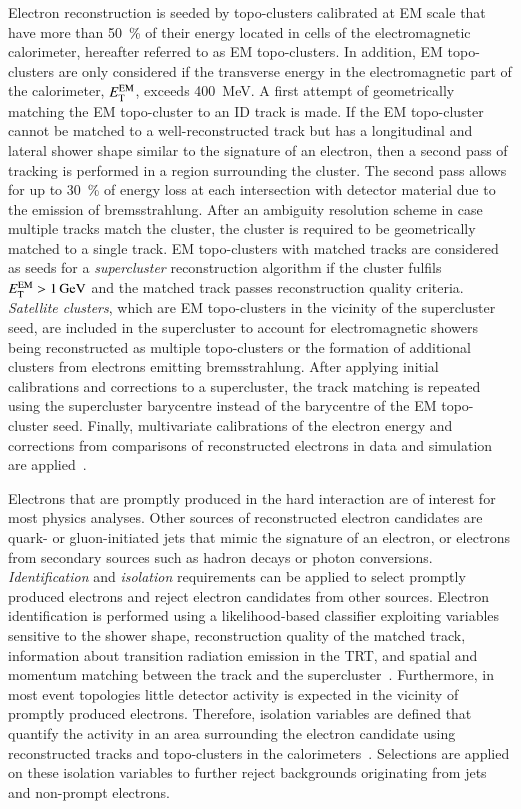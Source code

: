 Electron reconstruction is seeded by topo-clusters calibrated at EM scale that
have more than \SI{50}{\percent} of their energy located in cells of the
electromagnetic calorimeter, hereafter referred to as EM topo-clusters. In
addition, EM topo-clusters are only considered if the transverse energy in the
electromagnetic part of the calorimeter, $E_{\text{T}}^{\text{EM}}$, exceeds
\SI{400}{\MeV}. A first attempt of geometrically matching the EM topo-cluster to
an ID track is made. If the EM topo-cluster cannot be matched to a
well-reconstructed track but has a longitudinal and lateral shower shape similar
to the signature of an electron, then a second pass of tracking is performed in
a region surrounding the cluster. The second pass allows for up to
\SI{30}{\percent} of energy loss at each intersection with detector material due
to the emission of bremsstrahlung. After an ambiguity resolution scheme in case
multiple tracks match the cluster, the cluster is required to be geometrically
matched to a single track. EM topo-clusters with matched tracks are considered
as seeds for a \emph{supercluster} reconstruction algorithm if the cluster
fulfils $E_{\text{T}}^{\text{EM}} > \SI{1}{\ensuremath{\text{GeV}}}$ and the matched track passes
reconstruction quality criteria. \emph{Satellite clusters}, which are EM
topo-clusters in the vicinity of the supercluster seed, are included in the
supercluster to account for electromagnetic showers being reconstructed as
multiple topo-clusters or the formation of additional clusters from electrons
emitting bremsstrahlung. After applying initial calibrations and corrections to
a supercluster, the track matching is repeated using the supercluster barycentre
instead of the barycentre of the EM topo-cluster seed. Finally, multivariate
calibrations of the electron energy and corrections from comparisons of
reconstructed electrons in data and simulation are
applied~\cite{PERF-2017-03,EGAM-2018-01}.

Electrons that are promptly produced in the hard interaction are of interest for
most physics analyses. Other sources of reconstructed electron candidates are
quark- or gluon-initiated jets that mimic the signature of an electron, or
electrons from secondary sources such as hadron decays or photon
conversions. \emph{Identification} and \emph{isolation} requirements can be
applied to select promptly produced electrons and reject electron candidates
from other sources. Electron identification is performed using a
likelihood-based classifier exploiting variables sensitive to the shower shape,
reconstruction quality of the matched track, information about transition
radiation emission in the TRT, and spatial and momentum matching between the
track and the supercluster~\cite{EGAM-2018-01}. Furthermore, in most event
topologies little detector activity is expected in the vicinity of promptly
produced electrons. Therefore, isolation variables are defined that quantify the
activity in an area surrounding the electron candidate using reconstructed
tracks and topo-clusters in the calorimeters~\cite{EGAM-2018-01}. Selections are
applied on these isolation variables to further reject backgrounds originating
from jets and non-prompt electrons.


